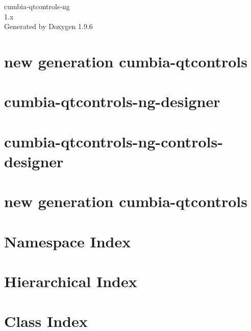 \documentclass[twoside]{book}
\newcommand{\+}{\discretionary{\mbox{\scriptsize$\hookleftarrow$}}{}{}}
\newcommand{\clearemptydoublepage}{%
    \newpage{\pagestyle{empty}\cleardoublepage}%
  }
\begin{document}
  \raggedbottom
  \begin{titlepage}
  \vspace*{7cm}
  \begin{center}%
  {\Large cumbia-\/qtcontrols-\/ng}\\
  [1ex]\large 1.\+x \\
  \vspace*{1cm}
  {\large Generated by Doxygen 1.9.6}\\
  \end{center}
  \end{titlepage}
  \clearemptydoublepage
  \tableofcontents
  \clearemptydoublepage
\chapter{new generation cumbia-\/qtcontrols}
\label{index}
\chapter{cumbia-\/qtcontrols-\/ng-\/designer}
\label{md_base_cumbia_qtcontrols_ng_base_designer_cumbia_qtcontrols_ng_designer}

\chapter{cumbia-\/qtcontrols-\/ng-\/controls-\/designer}
\label{md_controls_cumbia_qtcontrols_ng_controls_designer_cumbia_qtcontrols_ng_controls_designer}

\chapter{new generation cumbia-\/qtcontrols}
\label{md_README}

\chapter{Namespace Index}

\chapter{Hierarchical Index}

\chapter{Class Index}

\end{document}
